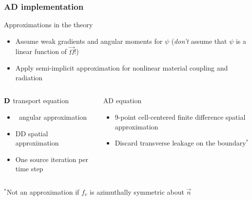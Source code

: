 \documentclass{beamer}
\begin{document}
\begin{frame}
  \frametitle{AD implementation}
  \begin{block}{Approximations in the theory}
    \begin{itemize}
      \item Assume weak gradients and angular moments for $\psi$ (\emph{don't}
        assume that $\psi$ is a linear function of $\vec{\Omega}$!)
      \item Apply semi-implicit approximation for nonlinear material coupling
        and radiation
    \end{itemize}
  \end{block}
  \vspace{-\baselineskip}
  \begin{columns}[t]
    \begin{column}{.48\textwidth}
\begin{block}{$\mathbf{D}$ transport equation}
  \begin{itemize}
    \item \SN\ angular approximation
    \item DD spatial approximation
    \item One source iteration per time step
  \end{itemize}
\end{block}
    \end{column}
    \begin{column}{.48\textwidth}
\begin{block}{AD equation}
  \begin{itemize}
    \item 9-point cell-centered finite difference spatial approximation
    \item Discard transverse leakage on the boundary$^*$
  \end{itemize}
\end{block}
    \end{column}
  \end{columns}

  \vspace{.5\baselineskip}
  {\small $^*$Not an approximation if $f_v$ is azimuthally symmetric about
  $\vec{n}$}
\end{frame}

\end{document}
